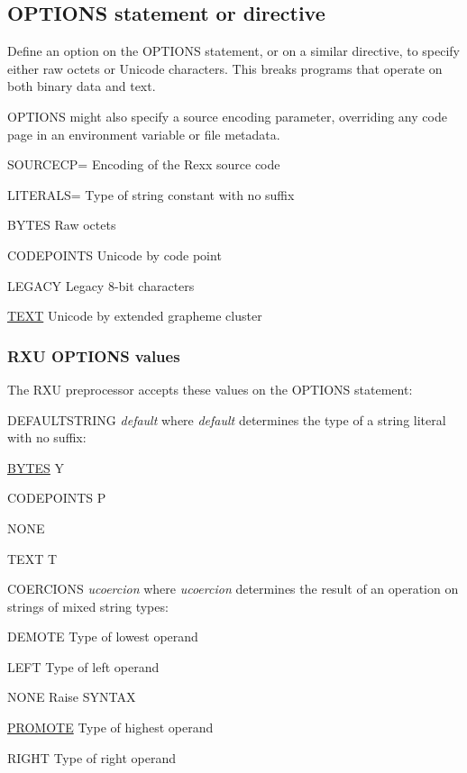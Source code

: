 \documentclass[b4paper]{article}
\begin{document}
\subsection{\textbf{OPTIONS} statement or directive}

Define an option on the OPTIONS statement, or on a similar directive,
to specify either raw octets or Unicode characters.
This breaks programs that operate on both binary data and text.

OPTIONS might also specify a source encoding parameter, overriding any
code page in an environment variable or file metadata.

\begin{definition}
\item[SOURCECP=] Encoding of the Rexx source code
\item[LITERALS=] Type of string constant with no suffix
\begin{definition}
\item[BYTES] Raw octets
\item[CODEPOINTS] Unicode by code point
\item[LEGACY] Legacy 8-bit characters
\item[\underline{TEXT}] Unicode by extended grapheme cluster
\end{definition}
\end{definition}

\subsubsection{RXU OPTIONS values}

The RXU preprocessor accepts these\cite{RXU:OPT} values on the OPTIONS statement:

\begin{definition}
\item[DEFAULTSTRING \textit{default}] where \textit{default} determines the type of a string literal with no suffix:
\begin{definition}
\item[\underline{BYTES}]Y
\item[CODEPOINTS]P
\item[NONE]
\item[TEXT]T
\end{definition}
\item[COERCIONS \textit{ucoercion}] where \textit{ucoercion} determines the result of an operation on strings of mixed string types:
\begin{definition}
\item[DEMOTE]Type of lowest operand
\item[LEFT]Type of left operand
\item[NONE]Raise SYNTAX
\item[\underline{PROMOTE}]Type of highest operand
\item[RIGHT]Type of right operand
\end{definition}
\end{definition}
\end{document}
